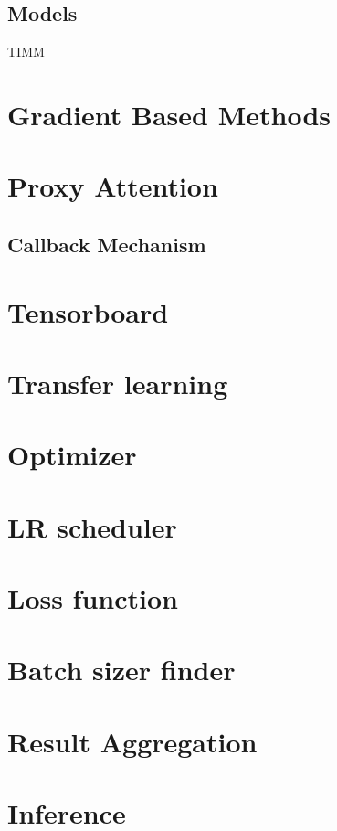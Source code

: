 \subsection{Models}
TIMM

\section{Gradient Based Methods}
\section{Proxy Attention}
\subsection{Callback Mechanism}
\section{Tensorboard}
\section{Transfer learning}
\section{Optimizer}
\section{LR scheduler}
\section{Loss function}
\section{Batch sizer finder}
\section{Result Aggregation}

\section{Inference}